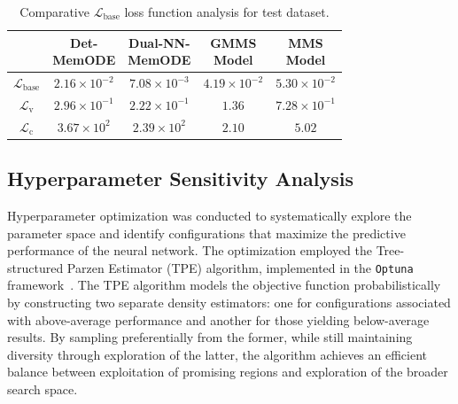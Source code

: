 \documentclass[lettersize,journal]{IEEEtran}
\begin{document}
\begin{table}
  \caption{Comparative \(\mathcal{L}_{\mathrm{base}}\) loss function analysis for test dataset.}
  \label{tab:mms_comp_test}
  \begin{tabular}{c|cccc}
    \toprule

                                  & \makecell{Det-                                                                                                                                                                          \\MemODE}             & \makecell{Dual-NN-                                                                                                             \\ MemODE}                 & \makecell{GMMS\\Model}             & \makecell{MMS\\Model}                                        \\
    \midrule
    $\mathcal{L}_{\mathrm{base}}$ & $2.16 \times 10^{-2}$                          & \color{ieeegreen} \bfseries $7.08 \times 10^{-3}$ & $4.19 \times 10^{-2}$                & \color{ieeered} \bfseries $5.30 \times 10^{-2}$ \\
    $\mathcal{L}_{\mathrm{v}}$    & $2.96 \times 10^{-1}$                          & \color{ieeegreen} \bfseries $2.22 \times 10^{-1}$ & \color{ieeered} \bfseries $1.36 $   & $7.28 \times 10^{-1}$                           \\
    $\mathcal{L}_{\mathrm{c}}$    & \color{ieeered} \bfseries $3.67 \times 10^{2}$ & $2.39 \times 10^{2}$                              & \color{ieeegreen} \bfseries $2.10 $ & $5.02 $                                        \\
    \bottomrule
  \end{tabular}
\end{table}

\subsection{Hyperparameter Sensitivity Analysis}
\noindent Hyperparameter optimization was conducted to systematically explore the parameter space and identify configurations that maximize the predictive performance of the neural network. The optimization employed the Tree-structured Parzen Estimator (TPE) algorithm, implemented in the \verb|Optuna| framework~\cite{akiba2019optuna}. The TPE algorithm models the objective function probabilistically by constructing two separate density estimators: one for configurations associated with above-average performance and another for those yielding below-average results. By sampling preferentially from the former, while still maintaining diversity through exploration of the latter, the algorithm achieves an efficient balance between exploitation of promising regions and exploration of the broader search space.
\end{document}
